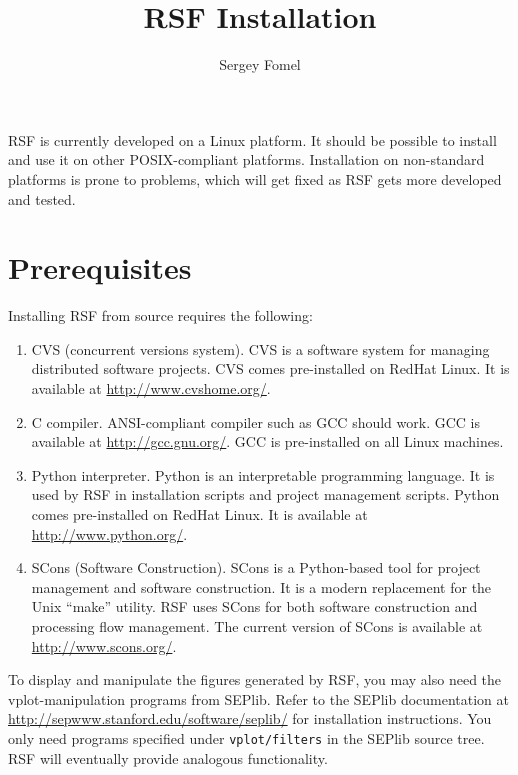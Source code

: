 \title{RSF Installation}
\author{Sergey Fomel}

%

\maketitle

RSF is currently developed on a Linux platform. It should be possible to
install and use it on other POSIX-compliant platforms. Installation on
non-standard platforms is prone to problems, which will get fixed as RSF
gets more developed and tested.

\section{Prerequisites}

Installing RSF from source requires the following:
\begin{enumerate}
\item CVS (concurrent versions system). CVS is a software system for managing
  distributed software projects. CVS comes pre-installed on RedHat Linux. It
  is available at \url{http://www.cvshome.org/}.
\item C compiler. ANSI-compliant compiler such as GCC should work. GCC is
  available at \url{http://gcc.gnu.org/}. GCC is pre-installed on all Linux
  machines.
\item Python interpreter. Python is an interpretable programming language. It
  is used by RSF in installation scripts and project management scripts.
  Python comes pre-installed on RedHat Linux. It is available at \\
  \url{http://www.python.org/}.
\item SCons (Software Construction). SCons is a Python-based tool for project
  management and software construction. It is a modern replacement for the
  Unix ``make'' utility. RSF uses SCons for both software construction and
  processing flow management. The current version of SCons is available at  
  \url{http://www.scons.org/}.
\end{enumerate}

To display and manipulate the figures generated by RSF, you may also need the
vplot-manipulation programs from SEPlib. Refer to the SEPlib documentation at
\\ \url{http://sepwww.stanford.edu/software/seplib/} for installation
instructions. You only need programs specified under \texttt{vplot/filters} in
the SEPlib source tree. RSF will eventually provide analogous functionality.

